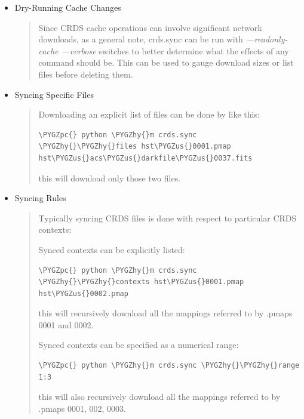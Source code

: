 \documentclass[letterpaper,10pt,english]{sphinxmanual}
\def\PYGZus{\char`\_}
\def\PYGZpc{\char`\%}
\def\PYGZhy{\char`\-}
\begin{document}
\begin{itemize}
\item {} 
Dry-Running Cache Changes
\begin{quote}

Since CRDS cache operations can involve significant network downloads,  as a general note,
crds.sync can be run with \emph{---readonly-cache ---verbose} switches to better determine what
the effects of any command should be.   This can be used to gauge download sizes or list
files before deleting them.
\end{quote}

\item {} 
Syncing Specific Files
\begin{quote}

Downloading an explicit list of files can be done by like this:

\begin{Verbatim}[commandchars=\\\{\}]
\PYGZpc{} python \PYGZhy{}m crds.sync  \PYGZhy{}\PYGZhy{}files hst\PYGZus{}0001.pmap hst\PYGZus{}acs\PYGZus{}darkfile\PYGZus{}0037.fits
\end{Verbatim}

this will download only those two files.
\end{quote}

\item {} 
Syncing Rules
\begin{quote}

Typically syncing CRDS files is done with respect to particular CRDS contexts:

Synced contexts can be explicitly listed:

\begin{Verbatim}[commandchars=\\\{\}]
\PYGZpc{} python \PYGZhy{}m crds.sync  \PYGZhy{}\PYGZhy{}contexts hst\PYGZus{}0001.pmap hst\PYGZus{}0002.pmap
\end{Verbatim}

this will recursively download all the mappings referred to by .pmaps 0001 and 0002.

Synced contexts can be specified as a numerical range:

\begin{Verbatim}[commandchars=\\\{\}]
\PYGZpc{} python \PYGZhy{}m crds.sync \PYGZhy{}\PYGZhy{}range 1:3
\end{Verbatim}

this will also recursively download all the mappings referred to by .pmaps 0001, 002, 0003.


\end{quote}
\end{itemize}
\end{document}
